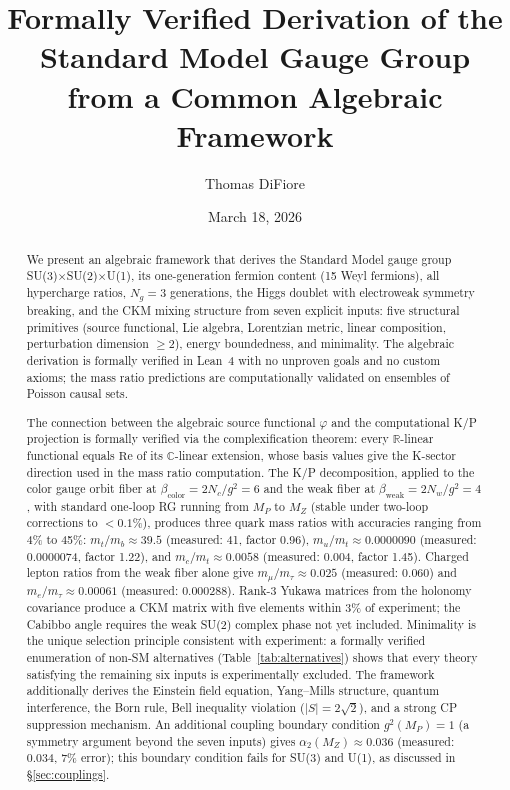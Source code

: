 \documentclass[12pt,a4paper]{article}
\title{Formally Verified Derivation of the Standard Model Gauge Group\\from a Common Algebraic Framework}
\author{Thomas DiFiore}
\date{March 18, 2026}
\begin{document}
\maketitle

\begin{abstract}
We present an algebraic framework that derives the Standard Model gauge group SU(3)$\times$SU(2)$\times$U(1), its one-generation fermion content (15 Weyl fermions), all hypercharge ratios, $N_g = 3$ generations, the Higgs doublet with electroweak symmetry breaking, and the CKM mixing structure from seven explicit inputs: five structural primitives (source functional, Lie algebra, Lorentzian metric, linear composition, perturbation dimension $\geq 2$), energy boundedness, and minimality. The algebraic derivation is formally verified in Lean~4 with no unproven goals and no custom axioms; the mass ratio predictions are computationally validated on ensembles of Poisson causal sets.

The connection between the algebraic source functional $\varphi$ and the computational K/P projection is formally verified via the complexification theorem: every $\mathbb{R}$-linear functional equals $\mathrm{Re}$ of its $\mathbb{C}$-linear extension, whose basis values give the K-sector direction used in the mass ratio computation. The K/P decomposition, applied to the color gauge orbit fiber at $\beta_{\mathrm{color}} = 2N_c/g^2 = 6$ and the weak fiber at $\beta_{\mathrm{weak}} = 2N_w/g^2 = 4$, with standard one-loop RG running from $M_P$ to $M_Z$ (stable under two-loop corrections to $< 0.1\%$), produces three quark mass ratios with accuracies ranging from 4\% to 45\%: $m_t/m_b \approx 39.5$ (measured: 41, factor 0.96), $m_u/m_t \approx 0.0000090$ (measured: 0.0000074, factor 1.22), and $m_c/m_t \approx 0.0058$ (measured: 0.004, factor 1.45). Charged lepton ratios from the weak fiber alone give $m_\mu/m_\tau \approx 0.025$ (measured: 0.060) and $m_e/m_\tau \approx 0.00061$ (measured: 0.000288). Rank-3 Yukawa matrices from the holonomy covariance produce a CKM matrix with five elements within 3\% of experiment; the Cabibbo angle requires the weak SU(2) complex phase not yet included. Minimality is the unique selection principle consistent with experiment: a formally verified enumeration of non-SM alternatives (Table~\ref{tab:alternatives}) shows that every theory satisfying the remaining six inputs is experimentally excluded. The framework additionally derives the Einstein field equation, Yang--Mills structure, quantum interference, the Born rule, Bell inequality violation ($|S| = 2\sqrt{2}$), and a strong CP suppression mechanism. An additional coupling boundary condition $g^2(M_P) = 1$ (a symmetry argument beyond the seven inputs) gives $\alpha_2(M_Z) \approx 0.036$ (measured: 0.034, 7\% error); this boundary condition fails for SU(3) and U(1), as discussed in \S\ref{sec:couplings}.
\end{abstract}
\end{document}
